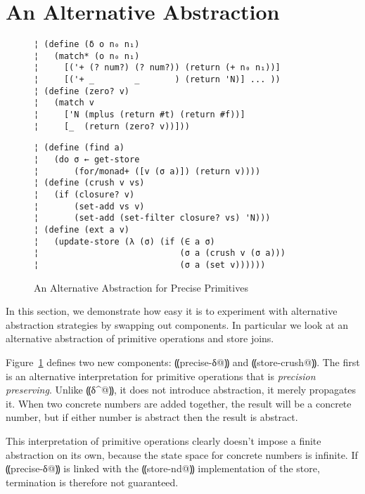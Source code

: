 \section{An Alternative Abstraction}\label{s:alt-abstraction}

\begin{figure} %
\begin{lstlisting}
¦ (define (δ o n₀ n₁)
¦   (match* (o n₀ n₁)
¦     [('+ (? num?) (? num?)) (return (+ n₀ n₁))]
¦     [('+ _        _       ) (return 'N)] ... ))
¦ (define (zero? v)
¦   (match v
¦     ['N (mplus (return #t) (return #f))]
¦     [_  (return (zero? v))]))
\end{lstlisting}
\figskip{}
\begin{lstlisting}
¦ (define (find a)
¦   (do σ ← get-store
¦       (for/monad+ ([v (σ a)]) (return v))))
¦ (define (crush v vs)
¦   (if (closure? v)
¦       (set-add vs v)
¦       (set-add (set-filter closure? vs) 'N)))
¦ (define (ext a v)
¦   (update-store (λ (σ) (if (∈ a σ)
¦                            (σ a (crush v (σ a)))
¦                            (σ a (set v))))))
\end{lstlisting}
\caption{An Alternative Abstraction for Precise Primitives}
\label{f:pres-delta}
\end{figure} %

In this section, we demonstrate how easy it is to experiment with alternative
abstraction strategies by swapping out components.  In particular we look at an
alternative abstraction of primitive operations and store joins.

Figure~\ref{f:pres-delta} defines two new components: ⸨precise-δ@⸩ and
⸨store-crush@⸩.  The first is an alternative interpretation for primitive
operations that is \emph{precision preserving}.  Unlike ⸨δ^@⸩, it does not
introduce abstraction, it merely propagates it.  When two concrete
numbers are added together, the result will be a concrete number, but if either
number is abstract then the result is abstract.

This interpretation of primitive operations clearly doesn't impose a finite
abstraction on its own, because the state space for concrete numbers is
infinite. If ⸨precise-δ@⸩ is linked with the ⸨store-nd@⸩ implementation of the
store, termination is therefore not guaranteed.  

